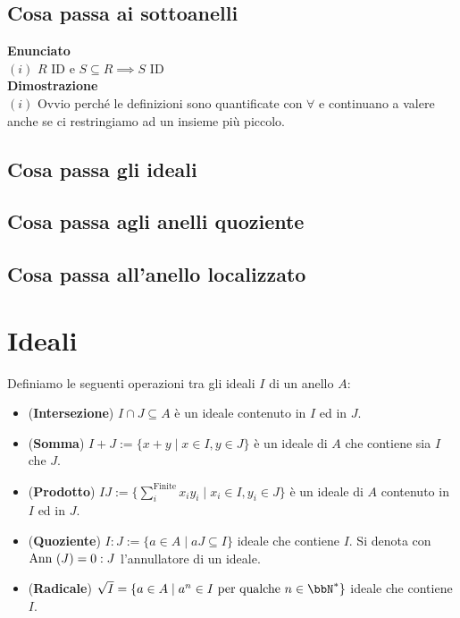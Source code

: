 \documentclass[a4paper,GeneralMath,NoNotes]{stdmdoc}
\newcommand{\Enunciato}{\vskip 0.05cm \noindent \textbf{Enunciato} \\ }
\renewcommand{\Dimostrazione}{\vskip 0.05cm \noindent \textbf{Dimostrazione} \\ }
\begin{document}
	\subsection{Cosa passa ai sottoanelli}
	\Enunciato
		$(i)$ $R$ ID e $S \subseteq R \implies S$ ID \\

	\Dimostrazione
		$(i)$ Ovvio perché le definizioni sono quantificate con $\forall$ e continuano a valere anche se ci restringiamo ad un insieme più piccolo.

	\subsection{Cosa passa gli ideali}

	\subsection{Cosa passa agli anelli quoziente}

	\subsection{Cosa passa all'anello localizzato}

	\section*{Ideali}
	Definiamo le seguenti operazioni tra gli ideali $I$ di un anello $A$: \\
	\begin{itemize}
		\item ({\bf Intersezione}) $I\cap J \subseteq A$ è un ideale contenuto in $I$ ed in $J$.
		\item ({\bf Somma}) $I + J := \{ x + y \mid x \in I, y \in J \}$ è un ideale di $A$ che contiene sia $I$ che $J$.
		\item ({\bf Prodotto}) $IJ := \{ \sum_i^{\text{Finite}} x_iy_i \mid x_i \in I, y_i \in J \}$ è un ideale di $A$ contenuto in $I$ ed in $J$.
		\item ({\bf Quoziente}) $ I:J := \{ a \in A \mid aJ \subseteq I \} $ ideale che contiene $I$. Si denota con $\mbox{Ann }(J) = 0:J$ l'annullatore di un ideale.
		\item ({\bf Radicale}) $\sqrt{I} = \{ a \in A \mid a^n \in I \text{ per qualche } n \in \bbN^{*} \}$ ideale che contiene $I$.
	\end{itemize}
\end{document}
